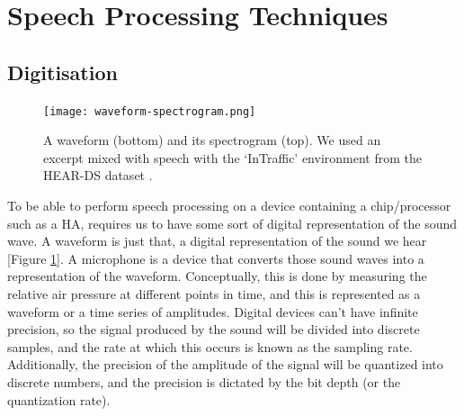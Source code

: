 \documentclass[logo,bsc,singlespacing,parskip,online]{infthesis}
\begin{document}


\newpage
\section{Speech Processing Techniques}
\subsection{Digitisation}
\begin{figure}[h]
   \centering
   \texttt{[image: waveform-spectrogram.png]}
   \caption{A waveform (bottom) and its spectrogram (top). 
   We used an excerpt mixed with speech with the `InTraffic'
   environment from the HEAR-DS dataset \citep{Huwel2020HearDS}.}
   \label{fig:waveform-spectrogram}
\end{figure}
To be able to perform speech processing on a device containing a chip/processor such as a HA, requires us 
to have some sort of digital representation of the sound wave. A waveform is just that, a digital representation 
of the sound we hear [Figure \ref{fig:waveform-spectrogram}]. A microphone is a device that converts those sound waves into a representation of the 
waveform. Conceptually, this is done by measuring the relative air pressure at different points in time, and 
this is represented as a waveform or a time series of amplitudes. Digital devices can't have infinite precision, so the signal produced by the sound will 
be divided into discrete samples, and the rate at which this occurs is known as the sampling rate. Additionally,
the precision of the amplitude of the signal will be quantized into discrete numbers, and the precision is 
dictated by the bit depth (or the quantization rate).
\end{document}
